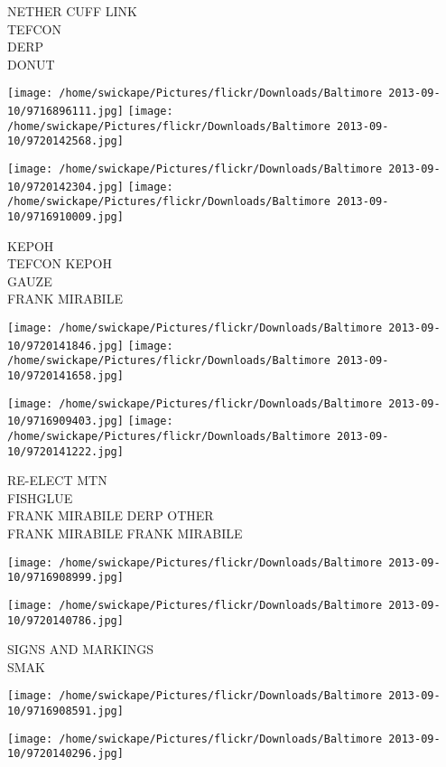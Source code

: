 \documentclass[10pt,letterpaper]{article}
\begin{document}
NETHER CUFF LINK\\
TEFCON\\
DERP\\
DONUT\\
\pagebreak

\texttt{[image: /home/swickape/Pictures/flickr/Downloads/Baltimore 2013-09-10/9716896111.jpg]}
\texttt{[image: /home/swickape/Pictures/flickr/Downloads/Baltimore 2013-09-10/9720142568.jpg]}

\texttt{[image: /home/swickape/Pictures/flickr/Downloads/Baltimore 2013-09-10/9720142304.jpg]}
\texttt{[image: /home/swickape/Pictures/flickr/Downloads/Baltimore 2013-09-10/9716910009.jpg]}

KEPOH\\
TEFCON KEPOH\\
GAUZE\\
FRANK MIRABILE\\
\pagebreak

\texttt{[image: /home/swickape/Pictures/flickr/Downloads/Baltimore 2013-09-10/9720141846.jpg]}
\texttt{[image: /home/swickape/Pictures/flickr/Downloads/Baltimore 2013-09-10/9720141658.jpg]}

\texttt{[image: /home/swickape/Pictures/flickr/Downloads/Baltimore 2013-09-10/9716909403.jpg]}
\texttt{[image: /home/swickape/Pictures/flickr/Downloads/Baltimore 2013-09-10/9720141222.jpg]}

RE{-}ELECT MTN\\
FISHGLUE\\
FRANK MIRABILE DERP OTHER\\
FRANK MIRABILE FRANK MIRABILE\\
\pagebreak

\texttt{[image: /home/swickape/Pictures/flickr/Downloads/Baltimore 2013-09-10/9716908999.jpg]}

\vspace{0.25in}
\texttt{[image: /home/swickape/Pictures/flickr/Downloads/Baltimore 2013-09-10/9720140786.jpg]}

SIGNS AND MARKINGS\\
SMAK\\
\pagebreak

\texttt{[image: /home/swickape/Pictures/flickr/Downloads/Baltimore 2013-09-10/9716908591.jpg]}

\vspace{0.25in}
\texttt{[image: /home/swickape/Pictures/flickr/Downloads/Baltimore 2013-09-10/9720140296.jpg]}
\end{document}
